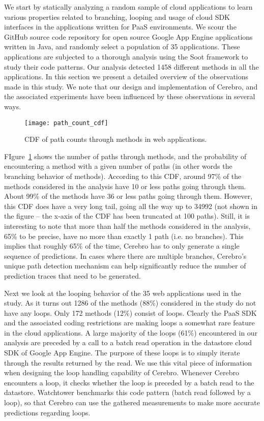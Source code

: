 We start by statically analyzing a random sample of cloud applications to learn various properties related
to branching, looping and usage of cloud SDK interfaces in the applications written for PaaS environments. 
We scour the GitHub source code repository for open source Google App Engine applications written in Java,
and randomly select a population of 35 applications. These applications are subjected to a thorough analysis
using the Soot framework to study their code patterns. Our analysis detected 1458 different methods in all the
applications. In this section we present a detailed overview of the observations made in this study. We note that
our design and implementation of Cerebro, and the associated experiments have been influenced by 
these observations in several ways.

\begin{figure}
\centering
\texttt{[image: path\_count\_cdf]}
\caption{CDF of path counts through methods in web applications.}
\label{fig:path_count_cdf}
\end{figure}

FIgure~\ref{fig:path_count_cdf} shows the number of paths through methods, and the probability of encountering
a method with a given number of paths (in other words the branching behavior of methods). According to this CDF, 
around 97\% of the methods considered in the analysis have 10 or less paths going through them. About 99\% of 
the methods have 36 or less paths going through them. However, this CDF does have a very long tail, going all the way
up to 34992 (not shown in the figure -- the x-axis of the CDF has been truncated at 100 paths). Still, it is interesting to note that more
than half the methods considered in the analysis, 65\% to be precise, have no more than exactly 1 path (i.e. no branches).
This implies that roughly 65\% of the time, Cerebro has to only generate a single sequence of predictions. In cases
where there are multiple branches, Cerebro's unique path detection mechanism can help significantly 
reduce the number of prediction traces that need to be generated.

Next we look at the looping behavior of the 35 web applications used in the study. As it turns out 1286 of the methods (88\%)
considered in the study
do not have any loops. Only 172 methods (12\%) consist of loops. Clearly the PaaS SDK and the associated coding restrictions
are making loops a somewhat rare feature in the cloud applications. A large majority of the loops (61\%) encountered in our analysis are
preceded by a call to a batch read operation in the datastore cloud SDK of Google App Engine. The purpose of these loops is to simply iterate
through the results returned by the read. We use this vital piece of information when designing the loop handling capability of
Cerebro. Whenever Cerebro encounters a loop, it checks whether the loop is preceded by a batch read to the datastore. Watchtower
benchmarks this code pattern (batch read followed by a loop), so that Cerebro can use the gathered measurements to make
more accurate predictions regarding loops.

